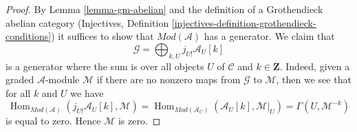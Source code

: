 \documentclass[10pt,a4paper]{amsart}
\theoremstyle{plain}
\theoremstyle{definition}
\theoremstyle{remark}
\numberwithin{equation}{subsection}
\def\Hom{\mathop{\mathrm{Hom}}\nolimits}
\begin{document}
\begin{proof}
By Lemma \ref{lemma-gm-abelian} and the definition of a Grothendieck
abelian category
(Injectives, Definition \ref{injectives-definition-grothendieck-conditions})
it suffices to
show that $\textit{Mod}(\mathcal{A})$ has a generator. We claim that
$$
\mathcal{G} = \bigoplus\nolimits_{k, U} j_{U!}\mathcal{A}_U[k]
$$
is a generator where the sum is over all objects $U$ of $\mathcal{C}$
and $k \in \mathbf{Z}$. Indeed, given a graded $\mathcal{A}$-module
$\mathcal{M}$ if there are no nonzero maps from $\mathcal{G}$ to $\mathcal{M}$,
then we see that for all $k$ and $U$ we have
$$
\Hom_{\textit{Mod}(\mathcal{A})}(j_{U!}\mathcal{A}_U[k], \mathcal{M}) =
\Hom_{\textit{Mod}(\mathcal{A}_U)}(\mathcal{A}_U[k], \mathcal{M}|_U) =
\Gamma(U, \mathcal{M}^{-k})
$$
is equal to zero. Hence $\mathcal{M}$ is zero.
\end{proof}
\end{document}
